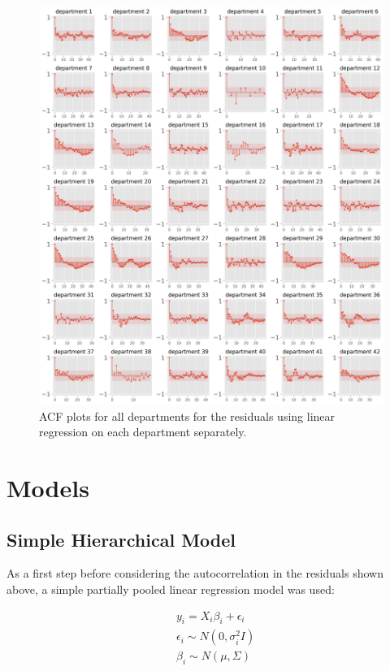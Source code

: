 \documentclass[paper=a4, fontsize=11pt]{scrartcl}
\begin{document}
\begin{figure}[!htb]\label{autocorr}
\centering
\includegraphics[width=1\textwidth]{acf_plots1.png}
\caption{ACF plots for all departments for the residuals using linear regression on each department separately.}
\end{figure}

\newpage
\section{Models}
\subsection{Simple Hierarchical Model}
As a first step before considering the autocorrelation in the residuals shown above, a simple partially pooled linear regression model was used:


\begin{align*}
    &y_i = X_i \beta_i+ \epsilon_i \\
     &\epsilon_i \sim N(0, \sigma^2_i I)\\
      &\beta_i \sim N(\mu, \Sigma)
\end{align*}
\end{document}
